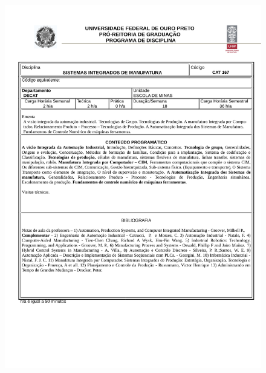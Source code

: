 \begin{figure}[p]
	\centering 
	\includegraphics[scale=0.7]{capitulos/anexo1-programas-disciplina/p92.pdf}
\end{figure}

